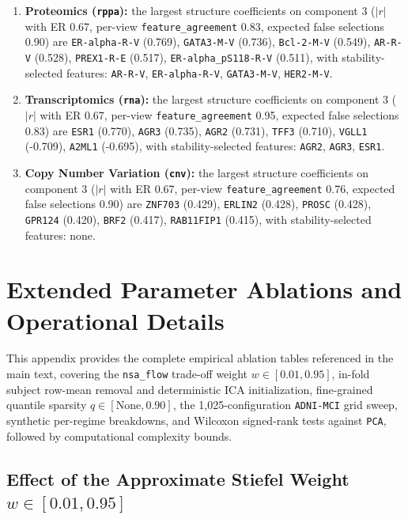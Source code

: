 \documentclass[
  10pt,
  letterpaper,
]{report}
\newcounter{none} %
\providecommand{\tightlist}{%
  \setlength{\itemsep}{0pt}\setlength{\parskip}{0pt}}
\begin{document}
\begin{enumerate}
\def\labelenumi{\arabic{enumi}.}
\tightlist
\item
  \textbf{Proteomics (\texttt{rppa}):} the largest structure
  coefficients on component 3 (\(|r|\) with ER 0.67, per-view
  \texttt{feature\_agreement} 0.83, expected false selections 0.90) are
  \texttt{ER-alpha-R-V} (0.769), \texttt{GATA3-M-V} (0.736),
  \texttt{Bcl-2-M-V} (0.549), \texttt{AR-R-V} (0.528),
  \texttt{PREX1-R-E} (0.517), \texttt{ER-alpha\_pS118-R-V} (0.511), with
  stability-selected features: \texttt{AR-R-V}, \texttt{ER-alpha-R-V},
  \texttt{GATA3-M-V}, \texttt{HER2-M-V}.
\item
  \textbf{Transcriptomics (\texttt{rna}):} the largest structure
  coefficients on component 3 (\(|r|\) with ER 0.67, per-view
  \texttt{feature\_agreement} 0.95, expected false selections 0.83) are
  \texttt{ESR1} (0.770), \texttt{AGR3} (0.735), \texttt{AGR2} (0.731),
  \texttt{TFF3} (0.710), \texttt{VGLL1} (-0.709), \texttt{A2ML1}
  (-0.695), with stability-selected features: \texttt{AGR2},
  \texttt{AGR3}, \texttt{ESR1}.
\item
  \textbf{Copy Number Variation (\texttt{cnv}):} the largest structure
  coefficients on component 3 (\(|r|\) with ER 0.67, per-view
  \texttt{feature\_agreement} 0.76, expected false selections 0.90) are
  \texttt{ZNF703} (0.429), \texttt{ERLIN2} (0.428), \texttt{PROSC}
  (0.428), \texttt{GPR124} (0.420), \texttt{BRF2} (0.417),
  \texttt{RAB11FIP1} (0.415), with stability-selected features: none.
\end{enumerate}

\chapter{Extended Parameter Ablations and Operational
Details}\label{sec-app-operational}

This appendix provides the complete empirical ablation tables referenced
in the main text, covering the \texttt{nsa\_flow} trade-off weight
\(w \in [0.01, 0.95]\), in-fold subject row-mean removal and
deterministic ICA initialization, fine-grained quantile sparsity
\(q \in [\text{None}, 0.90]\), the 1,025-configuration \texttt{ADNI-MCI}
grid sweep, synthetic per-regime breakdowns, and Wilcoxon signed-rank
tests against \texttt{PCA}, followed by computational complexity bounds.

\section{\texorpdfstring{Effect of the Approximate Stiefel Weight
\(w \in [0.01, 0.95]\)}{Effect of the Approximate Stiefel Weight w \textbackslash in {[}0.01, 0.95{]}}}\label{effect-of-the-approximate-stiefel-weight-w-in-0.01-0.95}
\end{document}
